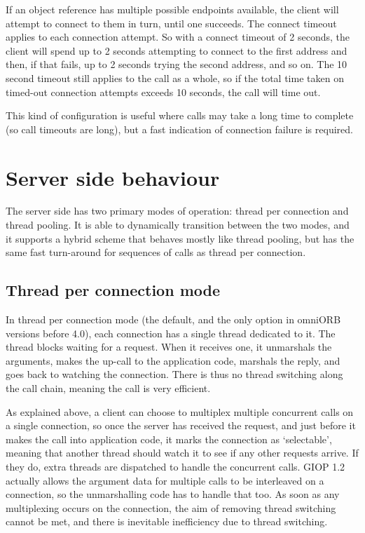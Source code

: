 \documentclass[11pt,oneside,a4paper]{book}
\begin{document}
If an object reference has multiple possible endpoints available, the
client will attempt to connect to them in turn, until one succeeds.
The connect timeout applies to each connection attempt. So with a
connect timeout of 2 seconds, the client will spend up to 2 seconds
attempting to connect to the first address and then, if that fails, up
to 2 seconds trying the second address, and so on. The 10 second
timeout still applies to the call as a whole, so if the total time
taken on timed-out connection attempts exceeds 10 seconds, the call
will time out.

This kind of configuration is useful where calls may take a long time
to complete (so call timeouts are long), but a fast indication of
connection failure is required.


\section{Server side behaviour}

The server side has two primary modes of operation: thread per
connection and thread pooling. It is able to dynamically transition
between the two modes, and it supports a hybrid scheme that behaves
mostly like thread pooling, but has the same fast turn-around for
sequences of calls as thread per connection.

\subsection{Thread per connection mode}

In thread per connection mode (the default, and the only option in
omniORB versions before 4.0), each connection has a single thread
dedicated to it. The thread blocks waiting for a request. When it
receives one, it unmarshals the arguments, makes the up-call to the
application code, marshals the reply, and goes back to watching the
connection. There is thus no thread switching along the call chain,
meaning the call is very efficient.

As explained above, a client can choose to multiplex multiple
concurrent calls on a single connection, so once the server has
received the request, and just before it makes the call into
application code, it marks the connection as `selectable', meaning
that another thread should watch it to see if any other requests
arrive. If they do, extra threads are dispatched to handle the
concurrent calls. GIOP 1.2 actually allows the argument data for
multiple calls to be interleaved on a connection, so the unmarshalling
code has to handle that too. As soon as any multiplexing occurs on the
connection, the aim of removing thread switching cannot be met, and
there is inevitable inefficiency due to thread switching.
\end{document}
